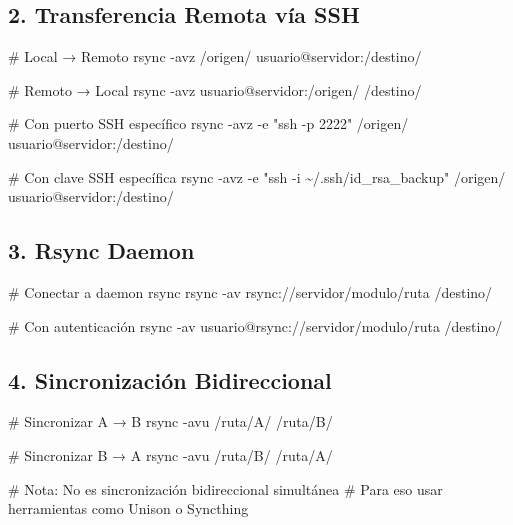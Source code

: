 \documentclass[
  doc,
  floatsintext,
  longtable,
  a4paper,
  nolmodern,
  notxfonts,
  notimes,
  12pt,
  colorlinks=true,linkcolor=blue,citecolor=blue,urlcolor=blue]{apa7}
\newenvironment{Shaded}{\begin{snugshade}}{\end{snugshade}}
\newcommand{\AttributeTok}[1]{\textcolor[rgb]{0.40,0.45,0.13}{#1}}
\newcommand{\CommentTok}[1]{\textcolor[rgb]{0.37,0.37,0.37}{#1}}
\newcommand{\FunctionTok}[1]{\textcolor[rgb]{0.28,0.35,0.67}{#1}}
\newcommand{\NormalTok}[1]{\textcolor[rgb]{0.00,0.23,0.31}{#1}}
\newcommand{\StringTok}[1]{\textcolor[rgb]{0.13,0.47,0.30}{#1}}
\begin{document}
\subsection{2. Transferencia Remota vía
SSH}\label{transferencia-remota-vuxeda-ssh}

\begin{Shaded}
\begin{Highlighting}[]
\CommentTok{\# Local → Remoto}
\FunctionTok{rsync} \AttributeTok{{-}avz}\NormalTok{ /origen/ usuario@servidor:/destino/}

\CommentTok{\# Remoto → Local}
\FunctionTok{rsync} \AttributeTok{{-}avz}\NormalTok{ usuario@servidor:/origen/ /destino/}

\CommentTok{\# Con puerto SSH específico}
\FunctionTok{rsync} \AttributeTok{{-}avz} \AttributeTok{{-}e} \StringTok{"ssh {-}p 2222"}\NormalTok{ /origen/ usuario@servidor:/destino/}

\CommentTok{\# Con clave SSH específica}
\FunctionTok{rsync} \AttributeTok{{-}avz} \AttributeTok{{-}e} \StringTok{"ssh {-}i \textasciitilde{}/.ssh/id\_rsa\_backup"}\NormalTok{ /origen/ usuario@servidor:/destino/}
\end{Highlighting}
\end{Shaded}

\subsection{3. Rsync Daemon}\label{rsync-daemon}

\begin{Shaded}
\begin{Highlighting}[]
\CommentTok{\# Conectar a daemon rsync}
\FunctionTok{rsync} \AttributeTok{{-}av}\NormalTok{ rsync://servidor/modulo/ruta /destino/}

\CommentTok{\# Con autenticación}
\FunctionTok{rsync} \AttributeTok{{-}av}\NormalTok{ usuario@rsync://servidor/modulo/ruta /destino/}
\end{Highlighting}
\end{Shaded}

\subsection{4. Sincronización
Bidireccional}\label{sincronizaciuxf3n-bidireccional}

\begin{Shaded}
\begin{Highlighting}[]
\CommentTok{\# Sincronizar A → B}
\FunctionTok{rsync} \AttributeTok{{-}avu}\NormalTok{ /ruta/A/ /ruta/B/}

\CommentTok{\# Sincronizar B → A}
\FunctionTok{rsync} \AttributeTok{{-}avu}\NormalTok{ /ruta/B/ /ruta/A/}

\CommentTok{\# Nota: No es sincronización bidireccional simultánea}
\CommentTok{\# Para eso usar herramientas como Unison o Syncthing}
\end{Highlighting}
\end{Shaded}
\end{document}
